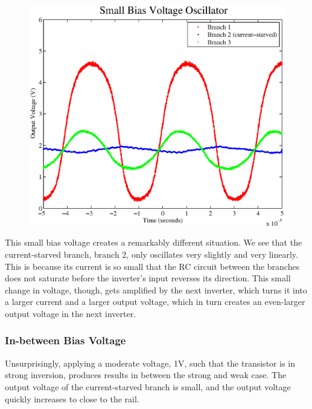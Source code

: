 \documentclass{article}
\begin{document}
\begin{figure}[H]
\centering
\includegraphics[scale=.6]{small_bias.eps}
\caption{}
\label{smallBias}
\end{figure}

This small bias voltage creates a remarkably different situation.  We see that the current-starved branch, branch 2, only oscillates very slightly and very linearly.  This is because its current is so small that the RC circuit between the branches does not saturate before the inverter's input reverses its direction.  This small change in voltage, though, gets amplified by the next inverter, which turns it into a larger current and a larger output voltage, which in turn creates an even-larger output voltage in the next inverter.

\subsubsection*{In-between Bias Voltage}

Unsurprisingly, applying a moderate voltage, 1V, such that the transistor is in strong inversion, produces results in between the strong and weak case.  The output voltage of the current-starved branch is small, and the output voltage quickly increases to close to the rail.
\end{document}
